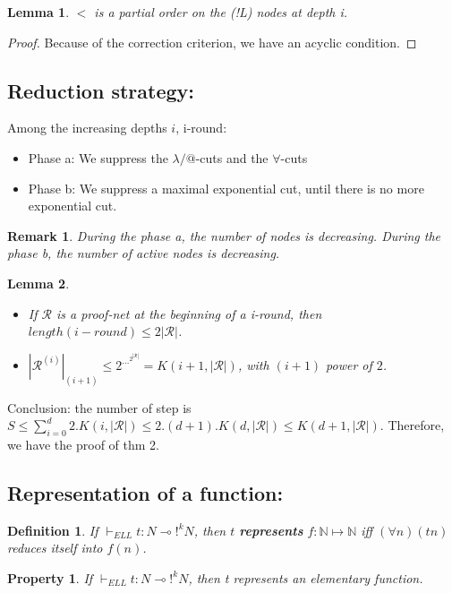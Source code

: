 \documentclass[a4paper,10pt]{article}
\newcommand{\limpl}{\multimap}  %
\newcommand{\pnet}{\mathcal{R}} %
\newcommand{\Nset}{\mathbb{N}} %
\newtheorem{definition}{Definition}
\newtheorem{prop}{Property}
\newtheorem{lem}{Lemma}
\newtheorem{rmk}{Remark}
\begin{document}
\begin{lem}
	$<$ is a partial order on the (!L) nodes at depth i.
\end{lem}
\begin{proof}
	Because of the correction criterion, we have an acyclic condition.
\end{proof}

\subsection{Reduction strategy:}
 Among the increasing depths $i$, i-round:
\begin{itemize}
	\item Phase a: We suppress the $\lambda/@$-cuts and the $\forall$-cuts
	\item Phase b: We suppress a maximal exponential cut, until there is no more exponential cut.
\end{itemize}

\begin{rmk}
	During the phase a, the number of nodes is decreasing. During the phase b, the number of active nodes is decreasing.
\end{rmk}
\begin{lem}
	\begin{itemize}
		\item If $\pnet$ is a proof-net at the beginning of a i-round, then $length(i-round) \leq 2 |\pnet|$.
		\item $|\pnet^{(i)}|_{(i+1)} \leq 2^{\dots^{2^{|\pnet|}}} = K(i+1, |\pnet|)$, with $(i+1)$ power of $2$.
	\end{itemize}
\end{lem}

 Conclusion: the number of step is $S \leq \sum_{i=0}^{d} 2.K(i,|\pnet|) \leq 2.(d+1).K(d,|\pnet|) \leq K(d+1,|\pnet|)$. Therefore, we have the proof of thm 2.


\subsection{Representation of a function:}

\begin{definition}
If $\vdash_{ELL} t: N \limpl !^{k} N$, then $t$ \textbf{represents} $f:\Nset \mapsto \Nset$ iff $(\forall n) (t n)$ reduces itself into $f(n)$.
\end{definition}

\begin{prop}
If $\vdash_{ELL} t:N \limpl !^{k} N$, then t represents an elementary function.
\end{prop}
\end{document}
